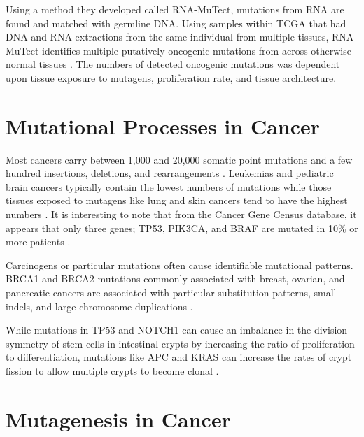 \documentclass[]{book}
\begin{document}
Using a method they developed called RNA-MuTect, mutations from RNA are found and matched with germline DNA. Using samples within TCGA that had DNA and RNA extractions from the same individual from multiple tissues, RNA-MuTect identifies multiple putatively oncogenic mutations from across otherwise normal tissues \citep{Yizhak2019-ch}. The numbers of detected oncogenic mutations was dependent upon tissue exposure to mutagens, proliferation rate, and tissue architecture.

\hypertarget{mutational-processes-in-cancer}{%
\section{Mutational Processes in Cancer}\label{mutational-processes-in-cancer}}

Most cancers carry between 1,000 and 20,000 somatic point mutations and a few hundred insertions, deletions, and rearrangements \citep{martincorena2015somatic}. Leukemias and pediatric brain cancers typically contain the lowest numbers of mutations while those tissues exposed to mutagens like lung and skin cancers tend to have the highest numbers \citep{stephens2009complex, alexandrov2013signatures, lawrence2013mutational, vogelstein2013cancer}. It is interesting to note that from the Cancer Gene Census database, it appears that only three genes; TP53, PIK3CA, and BRAF are mutated in 10\% or more patients \citep{martincorena2015somatic}.

Carcinogens or particular mutations often cause identifiable mutational patterns. BRCA1 and BRCA2 mutations commonly associated with breast, ovarian, and pancreatic cancers are associated with particular substitution patterns, small indels, and large chromosome duplications \citep{nik2012mutational}.

While mutations in TP53 and NOTCH1 can cause an imbalance in the division symmetry of stem cells in intestinal crypts by increasing the ratio of proliferation to differentiation\citep{klein2010stochastic, alcolea2014differentiation}, mutations like APC and KRAS can increase the rates of crypt fission to allow multiple crypts to become clonal \citep{preston2003bottom, snippert2014biased}.

\hypertarget{mutagenesis-in-cancer}{%
\section{Mutagenesis in Cancer}\label{mutagenesis-in-cancer}}
\end{document}

